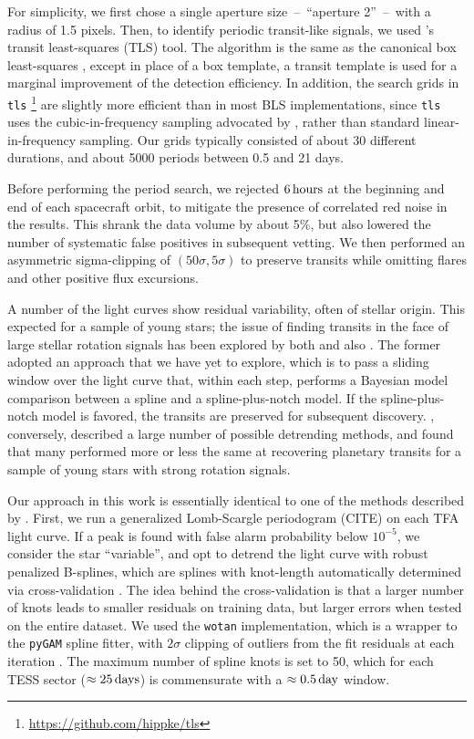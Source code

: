\documentclass[12pt,twocolumn,tighten]{aastex62}
\begin{document}
For simplicity,
we first chose a single aperture size~--~``aperture 2''~--~with a radius of 
1.5  pixels.
Then, to identify periodic transit-like signals, we used 
\citet{hippke_TLS_2019}'s transit least-squares (TLS) tool.
The algorithm is the same as the canonical box least-squares
\citep{kovacs_box-fitting_2002}, except in place of a box template, a transit 
template is used  for a marginal improvement of the detection efficiency.
In addition, the search grids in \texttt{tls} 
\footnote{\url{https://github.com/hippke/tls}} are slightly more 
efficient than in most BLS implementations, since \texttt{tls} uses the 
cubic-in-frequency sampling advocated by \citet{ofir_optimizing_2014}, 
rather than standard linear-in-frequency sampling.
Our grids typically consisted of about 30 different durations, and
about 5000 periods between 0.5 and 21 days. 

Before performing the period search, we rejected $6\,{\rm hours}$ at the
beginning and end of each spacecraft orbit, to mitigate the presence
of correlated red noise in the results.
This shrank the data volume by about 5\%, but also lowered the number
of systematic false positives in subsequent vetting.
We then performed an asymmetric sigma-clipping of $(50\sigma,5\sigma)$ to 
preserve transits while omitting flares and other positive flux excursions. 

A number of the light curves show residual variability, often of stellar 
origin.
This expected for a sample of young stars; the issue of finding transits in 
the face of large stellar rotation signals 
has been explored by both \citet{rizzuto_zeitV_2017} and also 
\citet{hippke_wotan_2019}.
The former adopted an approach that we have yet to explore, which is to 
pass a sliding window over the light curve that, within each step, performs a 
Bayesian model comparison between a spline and a spline-plus-notch model.  If 
the spline-plus-notch model is favored, the transits are preserved for 
subsequent discovery.
\citet{hippke_wotan_2019}, conversely, described a large number of possible 
detrending methods, and found that many performed more or less the same at 
recovering planetary transits for a sample of young stars with strong rotation 
signals.

Our approach in this work is essentially identical to one of the methods 
described by \citet{hippke_wotan_2019}.
First, we run a generalized Lomb-Scargle periodogram (CITE) on each TFA light 
curve.
If a peak is found with false alarm probability below $10^{-5}$, we consider 
the star ``variable'', and opt to 
detrend the light curve with robust penalized B-splines, which are splines 
with knot-length automatically determined via cross-validation 
\citep{eilers_flexible_1996}. The idea behind the cross-validation is that a 
larger  number of knots leads to smaller residuals on training data, but 
larger errors 
when tested on the entire dataset.
We used the \texttt{wotan} implementation, which is a wrapper to the 
\texttt{pyGAM} spline fitter, with $2\sigma$ clipping of outliers from the fit 
residuals at each iteration 
\citep{serven_pygam_2018_1476122,hippke_wotan_2019}.
The maximum number of spline knots is set to 50, which for each TESS sector 
($\approx 25\,{\rm days}$) is commensurate with a $\approx0.5\,{\rm day}$ 
window.
\end{document}
